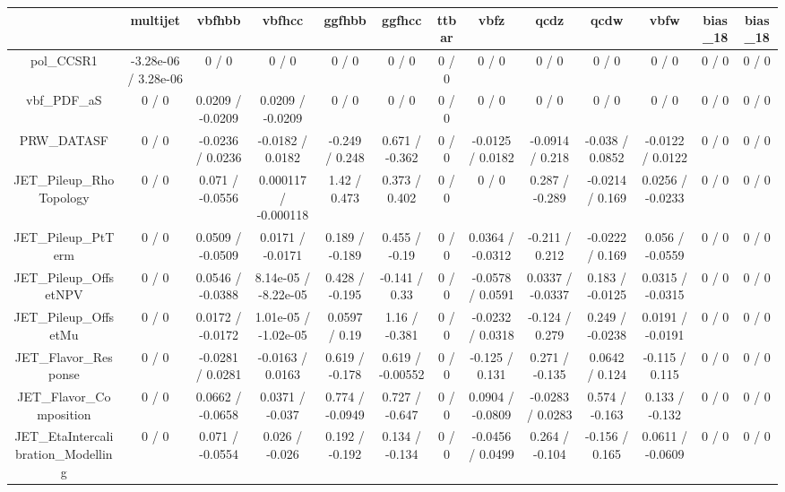\documentclass[10pt]{article}
\begin{document}
\begin{table}[htbp]
\begin{center}
\begin{tabular}{|c|c|c|c|c|c|c|c|c|c|c|c|c|}
\hline 
      & multijet      & vbfhbb      & vbfhcc      & ggfhbb      & ggfhcc      & ttbar      & vbfz      & qcdz      & qcdw      & vbfw      & bias_18      & bias_18 \\ 
\hline 
  pol_CCSR1 & -3.28e-06 / 3.28e-06 & 0 / 0 & 0 / 0 & 0 / 0 & 0 / 0 & 0 / 0 & 0 / 0 & 0 / 0 & 0 / 0 & 0 / 0 & 0 / 0 & 0 / 0 \\ 
  vbf_PDF_aS & 0 / 0 & 0.0209 / -0.0209 & 0.0209 / -0.0209 & 0 / 0 & 0 / 0 & 0 / 0 & 0 / 0 & 0 / 0 & 0 / 0 & 0 / 0 & 0 / 0 & 0 / 0 \\ 
  PRW_DATASF & 0 / 0 & -0.0236 / 0.0236 & -0.0182 / 0.0182 & -0.249 / 0.248 & 0.671 / -0.362 & 0 / 0 & -0.0125 / 0.0182 & -0.0914 / 0.218 & -0.038 / 0.0852 & -0.0122 / 0.0122 & 0 / 0 & 0 / 0 \\ 
  JET_Pileup_RhoTopology & 0 / 0 & 0.071 / -0.0556 & 0.000117 / -0.000118 & 1.42 / 0.473 & 0.373 / 0.402 & 0 / 0 & 0 / 0 & 0.287 / -0.289 & -0.0214 / 0.169 & 0.0256 / -0.0233 & 0 / 0 & 0 / 0 \\ 
  JET_Pileup_PtTerm & 0 / 0 & 0.0509 / -0.0509 & 0.0171 / -0.0171 & 0.189 / -0.189 & 0.455 / -0.19 & 0 / 0 & 0.0364 / -0.0312 & -0.211 / 0.212 & -0.0222 / 0.169 & 0.056 / -0.0559 & 0 / 0 & 0 / 0 \\ 
  JET_Pileup_OffsetNPV & 0 / 0 & 0.0546 / -0.0388 & 8.14e-05 / -8.22e-05 & 0.428 / -0.195 & -0.141 / 0.33 & 0 / 0 & -0.0578 / 0.0591 & 0.0337 / -0.0337 & 0.183 / -0.0125 & 0.0315 / -0.0315 & 0 / 0 & 0 / 0 \\ 
  JET_Pileup_OffsetMu & 0 / 0 & 0.0172 / -0.0172 & 1.01e-05 / -1.02e-05 & 0.0597 / 0.19 & 1.16 / -0.381 & 0 / 0 & -0.0232 / 0.0318 & -0.124 / 0.279 & 0.249 / -0.0238 & 0.0191 / -0.0191 & 0 / 0 & 0 / 0 \\ 
  JET_Flavor_Response & 0 / 0 & -0.0281 / 0.0281 & -0.0163 / 0.0163 & 0.619 / -0.178 & 0.619 / -0.00552 & 0 / 0 & -0.125 / 0.131 & 0.271 / -0.135 & 0.0642 / 0.124 & -0.115 / 0.115 & 0 / 0 & 0 / 0 \\ 
  JET_Flavor_Composition & 0 / 0 & 0.0662 / -0.0658 & 0.0371 / -0.037 & 0.774 / -0.0949 & 0.727 / -0.647 & 0 / 0 & 0.0904 / -0.0809 & -0.0283 / 0.0283 & 0.574 / -0.163 & 0.133 / -0.132 & 0 / 0 & 0 / 0 \\ 
  JET_EtaIntercalibration_Modelling & 0 / 0 & 0.071 / -0.0554 & 0.026 / -0.026 & 0.192 / -0.192 & 0.134 / -0.134 & 0 / 0 & -0.0456 / 0.0499 & 0.264 / -0.104 & -0.156 / 0.165 & 0.0611 / -0.0609 & 0 / 0 & 0 / 0 \\ 

\end{tabular}
\end{center}
\end{table}
\end{document}
